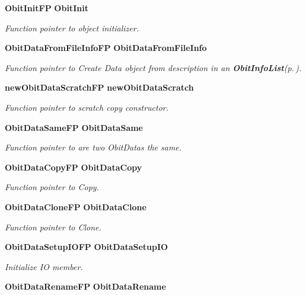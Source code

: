 \begin{CompactItemize}
{\bf Obit\-Init\-FP} {\bf Obit\-Init}
\begin{CompactList}\small\item\em Function pointer to object initializer. \item\end{CompactList}\item 
{\bf Obit\-Data\-From\-File\-Info\-FP} {\bf Obit\-Data\-From\-File\-Info}
\begin{CompactList}\small\item\em Function pointer to Create Data object from description in an {\bf Obit\-Info\-List}{\rm (p.\,\pageref{structObitInfoList})}. \item\end{CompactList}\item 
{\bf new\-Obit\-Data\-Scratch\-FP} {\bf new\-Obit\-Data\-Scratch}
\begin{CompactList}\small\item\em Function pointer to scratch copy constructor. \item\end{CompactList}\item 
{\bf Obit\-Data\-Same\-FP} {\bf Obit\-Data\-Same}
\begin{CompactList}\small\item\em Function pointer to are two Obit\-Datas the same. \item\end{CompactList}\item 
{\bf Obit\-Data\-Copy\-FP} {\bf Obit\-Data\-Copy}
\begin{CompactList}\small\item\em Function pointer to Copy. \item\end{CompactList}\item 
{\bf Obit\-Data\-Clone\-FP} {\bf Obit\-Data\-Clone}
\begin{CompactList}\small\item\em Function pointer to Clone. \item\end{CompactList}\item 
{\bf Obit\-Data\-Setup\-IOFP} {\bf Obit\-Data\-Setup\-IO}
\begin{CompactList}\small\item\em Initialize IO member. \item\end{CompactList}\item 
{\bf Obit\-Data\-Rename\-FP} {\bf Obit\-Data\-Rename}

\end{CompactItemize}
